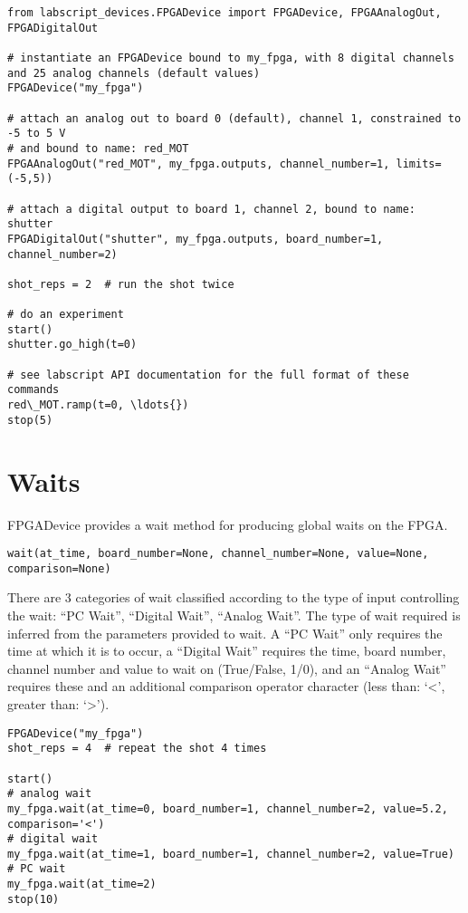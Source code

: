 \documentclass[11pt,a4paper]{article}
\begin{document}
\begin{verbatim}
from labscript_devices.FPGADevice import FPGADevice, FPGAAnalogOut, FPGADigitalOut

# instantiate an FPGADevice bound to my_fpga, with 8 digital channels and 25 analog channels (default values)
FPGADevice("my_fpga")

# attach an analog out to board 0 (default), channel 1, constrained to -5 to 5 V
# and bound to name: red_MOT
FPGAAnalogOut("red_MOT", my_fpga.outputs, channel_number=1, limits=(-5,5))

# attach a digital output to board 1, channel 2, bound to name: shutter
FPGADigitalOut("shutter", my_fpga.outputs, board_number=1, channel_number=2)

shot_reps = 2  # run the shot twice

# do an experiment
start()
shutter.go_high(t=0)

# see labscript API documentation for the full format of these commands
red\_MOT.ramp(t=0, \ldots{})
stop(5)
\end{verbatim}

\section{Waits}
FPGADevice provides a wait method for producing global waits on the FPGA.

\begin{verbatim}
wait(at_time, board_number=None, channel_number=None, value=None, comparison=None)
\end{verbatim}

There are 3 categories of wait classified according to the type of input
controlling the wait: ``PC Wait'', ``Digital Wait'', ``Analog Wait''.
The type of wait required is inferred from the parameters provided to
wait. A ``PC Wait'' only requires the time at which it is to occur, a
``Digital Wait'' requires the time, board number, channel number and
value to wait on (True/False, 1/0), and an ``Analog Wait'' requires
these and an additional comparison operator character (less than:
`\textless{}', greater than: `\textgreater{}').

\begin{verbatim}
FPGADevice("my_fpga")
shot_reps = 4  # repeat the shot 4 times

start()
# analog wait
my_fpga.wait(at_time=0, board_number=1, channel_number=2, value=5.2, comparison='<')
# digital wait
my_fpga.wait(at_time=1, board_number=1, channel_number=2, value=True)
# PC wait
my_fpga.wait(at_time=2)
stop(10)
\end{verbatim}
\end{document}
